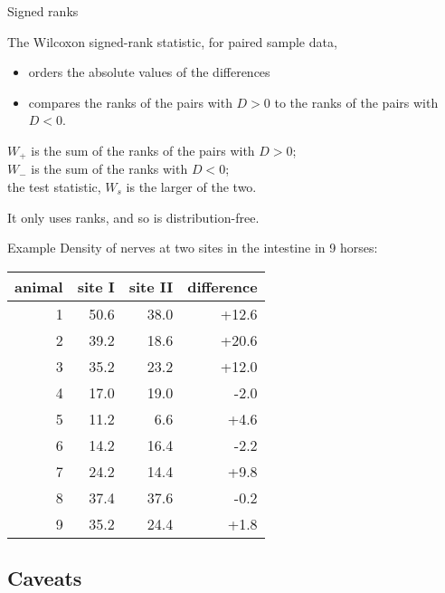 \begin{frame}{Signed ranks}

    The Wilcoxon signed-rank statistic, for paired sample data,
    \begin{itemize}
        \item orders the \alert{absolute values} of the differences
        \item compares the ranks of the pairs with $D>0$ to the ranks of the pairs with $D<0$.
    \end{itemize}

    \vspace{2em}

    $W_+$ is the sum of the ranks of the pairs with $D>0$; \\
    $W_-$ is the sum of the ranks with $D<0$; \\
    the \alert{test statistic}, $W_s$ is the larger of the two.

    \vspace{2em}

    It only uses \alert{ranks},
    and so is distribution-free.

\end{frame}

\begin{frame}{Example}
    Density of nerves at two sites in the intestine in 9 horses:
    \begin{center}
\begin{tabular}{rrrr}
  \hline
 animal & site I & site II & difference \\ 
  \hline
  1 &  50.6 & 38.0 & +12.6 \\ 
  2 &  39.2 & 18.6 & +20.6 \\ 
  3 &  35.2 & 23.2 & +12.0 \\ 
  4 &  17.0 & 19.0 & -2.0 \\ 
  5 &  11.2 & 6.6 & +4.6 \\ 
  6 &  14.2 & 16.4 & -2.2 \\ 
  7 &  24.2 & 14.4 & +9.8 \\ 
  8 &  37.4 & 37.6 & -0.2 \\ 
  9 &  35.2 & 24.4 & +1.8 \\ 
   \hline
\end{tabular}
    \end{center}

\end{frame}

\subsection{Caveats}


